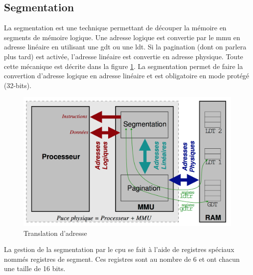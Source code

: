 \newpage


\subsection{Segmentation}
La segmentation est une technique permettant de découper la mémoire en segments
de mémoire logique. Une adresse logique est convertie par le \acrshort{mmu} en
adresse linéaire en utilisant une \acrshort{gdt} ou une \acrshort{ldt}.
Si la pagination (dont on parlera plus tard) est activée, l'adresse linéaire
est convertie en adresse physique. Toute cette mécanique est décrite dans la figure
\ref{addr_translation}. La segmentation permet de faire la convertion d'adresse
logique en adresse linéaire et est obligatoire en mode protégé (32-bits).\cite{ref17}

\begin{figure}[!h]
  \centering
  \includegraphics[scale=0.5]{images/addr_translation.png}
  \caption{Translation d'adresse}
  \label{addr_translation}
\end{figure}

La gestion de la segmentation par le \acrshort{cpu} se fait à l'aide de registres
spéciaux nommés registres de segment. Ces registres sont au nombre de 6 et ont
chacun une taille de 16 bits.\cite{ref42,ref18}

\begin{center}
\end{center}

